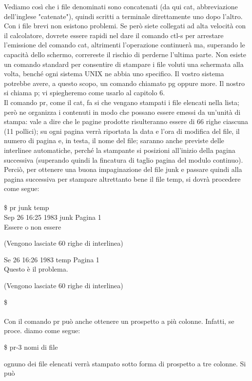 Vediamo così che i file denominati sono concatenati (da qui cat, abbreviazione
dell'inglese "catenate"), quindi scritti a terminale direttamente uno dopo l'altro.
Con i file brevi non esistono problemi. Se però siete collegati ad alta velocità con il
calcolatore, dovrete essere rapidi nel dare il comando ctl-s per arrestare l'emissione
del comando cat, altrimenti l'operazione continuerà ma, superando le capacità dello
schermo, correreste il rischio di perderne l'ultima parte. Non esiste un comando standard
 per consentire di stampare i file voluti una schermata alla volta, benché ogni sistema 
 UNIX ne abbia uno specifico. Il vostro sistema potrebbe avere, a questo scopo,
  un comando chiamato pg oppure more. Il nostro si chiama p; vi spiegheremo come
   usarlo al capitolo 6.\\
Il comando pr, come il cat, fa si che vengano stampati i file elencati nella lista; però
ne organizza i contenuti in modo che possano essere emessi da un'unità di stampa:
vale a dire che le pagine prodotte risulteranno essere di 66 righe ciascuna (11 pollici);
su ogni pagina verrà riportata la data e l'ora di modifica del file, il numero di pagina
e, in testa, il nome del file; saranno anche previste delle interlinee automatiche, perché
 la stampante si posizioni all'inizio della pagina successiva (superando quindi la
 fincatura di taglio pagina del modulo continuo). Perciò, per ottenere una buona
 impaginazione del file junk e passare quindi alla pagina successiva per stampare 
 altrettanto bene il file temp, si dovrà procedere come segue:\\\\
 \$ pr junk temp\\
 Sep 26 16:25 1983 junk Pagina 1\\
 Essere o non essere
 \begin{center}
 	(Vengono lasciate 60 righe di interlinea)
 \end{center}
 Se 26 16:26 1983 temp Pagina 1\\
 Questo è il problema.
 \begin{center}
 (Vengono lasciate 60 righe di interlinea)
 \end{center}
\$\\\\
Con il comando pr può anche ottenere un prospetto a più colonne. Infatti, se proce.
diamo come segue:
\begin{multicols}{2}
	\$ pr-3 nomi di file
\end{multicols}
ognuno dei file elencati verrà stampato sotto forma di prospetto a tre colonne. Si può
